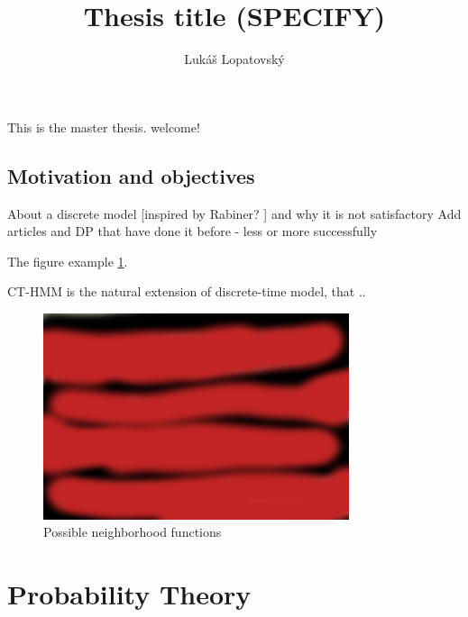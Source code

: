 \documentclass[thesis=M,english]{FITthesis}[2012/10/20]
\title{Thesis title (SPECIFY)}
\author{Luk{\' a}{\v s} Lopatovsk{\' y}} %
\begin{document}


\begin{introduction}
	This is the master thesis. welcome!
	\section{Motivation and objectives}
	About a discrete model [inspired by Rabiner? ] and why it is not satisfactory  %
	Add articles and DP that have done it before - less or more successfully 
	
The figure example \ref{fig:gb}.

CT-HMM is the natural extension of discrete-time model, that ..


\begin{figure}[h]
\centering
\includegraphics[width=0.8\textwidth]{img/ps.jpg}
\caption{Possible neighborhood functions \cite{Ho03} }
\label{fig:gb}
\end{figure} 	
	
	
\end{introduction}



\chapter{Probability Theory}
\end{document}
